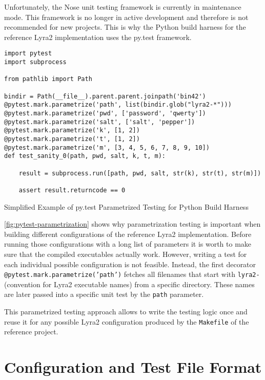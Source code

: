 Unfortunately, the Nose unit testing framework is currently in maintenance mode. This framework is no longer in active development and therefore is not recommended for new projects. This is why the Python build harness for the reference Lyra2 implementation uses the py.test framework.

\begin{listing}
\begin{verbatim}
import pytest
import subprocess

from pathlib import Path

bindir = Path(__file__).parent.parent.joinpath('bin42')
@pytest.mark.parametrize('path', list(bindir.glob("lyra2-*")))
@pytest.mark.parametrize('pwd', ['password', 'qwerty'])
@pytest.mark.parametrize('salt', ['salt', 'pepper'])
@pytest.mark.parametrize('k', [1, 2])
@pytest.mark.parametrize('t', [1, 2])
@pytest.mark.parametrize('m', [3, 4, 5, 6, 7, 8, 9, 10])
def test_sanity_0(path, pwd, salt, k, t, m):

    result = subprocess.run([path, pwd, salt, str(k), str(t), str(m)])

    assert result.returncode == 0
\end{verbatim}
\caption{Simplified Example of py.test Parametrized Testing for Python Build Harness}
\label{fig:pytest-parametrization}
\end{listing}

\autoref{fig:pytest-parametrization} shows why parametrization testing is important when building different configurations of the reference Lyra2 implementation. Before running those configurations with a long list of parameters it is worth to make sure that the compiled executables actually work. However, writing a test for each individual possible configuration is not feasible. Instead, the first decorator \texttt{@pytest.mark.parametrize('path')} fetches all filenames that start with \texttt{lyra2-} (convention for Lyra2 executable names) from a specific directory. These names are later passed into a specific unit test by the \texttt{path} parameter.

This parametrized testing approach allows to write the testing logic once and reuse it for any possible Lyra2 configuration produced by the \texttt{Makefile} of the reference project.

\section{Configuration and Test File Format}
\label{sec:configuration-and-test-file-format}

